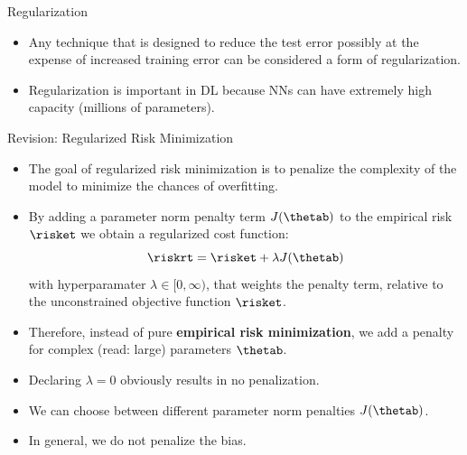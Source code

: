 







\begin{frame} {Regularization}
\begin{itemize}
\item Any technique that is designed to reduce the test error possibly at the expense of increased training error can be considered a form of regularization.
\item Regularization is important in DL because NNs can have extremely high capacity (millions of parameters).
\end{itemize}
\end{frame}

\begin{vbframe}{Revision: Regularized Risk Minimization}
\begin{itemize}
\item The goal of regularized risk minimization is to penalize the complexity of the model to minimize the chances of overfitting.
\item By adding a parameter norm penalty term \(J(\thetab)\) to the empirical risk $\risket$ we obtain a regularized cost function:
$$\riskrt = \risket + \lambda \text{\(J(\thetab)\)}$$
with hyperparamater $\lambda \in [0, \infty)$, that weights the penalty term, relative to the unconstrained objective function $\risket$.
\item Therefore, instead of pure \textbf{empirical risk minimization}, we add a penalty
for complex (read: large) parameters \(\thetab\).
\item Declaring $\lambda = 0$ obviously results in no penalization.
\item We can choose between different parameter norm penalties \(J(\thetab)\).
\item In general, we do not penalize the bias.
\end{itemize}
\end{vbframe}


